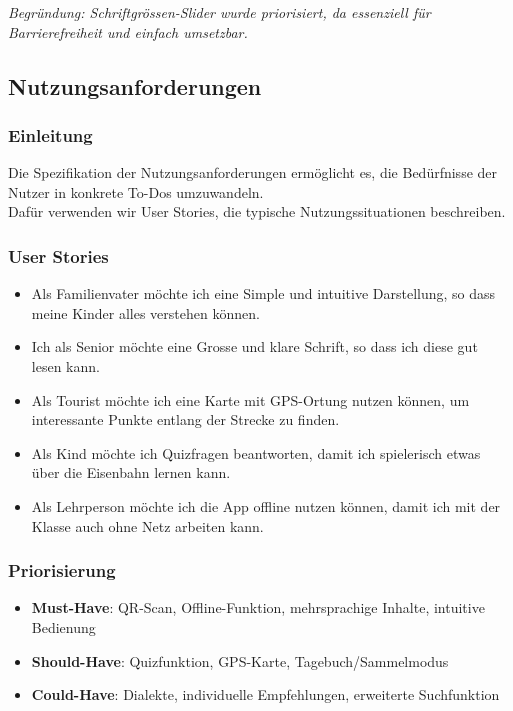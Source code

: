 \documentclass[10pt]{article}
\begin{document}
\textit{Begründung: Schriftgrössen-Slider wurde priorisiert, da essenziell für Barrierefreiheit und einfach umsetzbar.}
\pagebreak
\subsection{Nutzungsanforderungen}
\subsubsection{Einleitung}
Die Spezifikation der Nutzungsanforderungen ermöglicht es, die Bedürfnisse der Nutzer in konkrete To-Dos umzuwandeln.\\
Dafür verwenden wir User Stories, die typische Nutzungssituationen beschreiben.
\subsubsection{User Stories}
\begin{itemize}
	\item Als Familienvater möchte ich eine Simple und intuitive Darstellung, so dass meine Kinder alles verstehen können.
	\item Ich als Senior möchte eine Grosse und klare Schrift, so dass ich diese gut lesen kann.
	\item Als Tourist möchte ich eine Karte mit GPS-Ortung nutzen können, um interessante Punkte entlang der Strecke zu finden.
	\item Als Kind möchte ich Quizfragen beantworten, damit ich spielerisch etwas über die Eisenbahn lernen kann.
	\item Als Lehrperson möchte ich die App offline nutzen können, damit ich mit der Klasse auch ohne Netz arbeiten kann.
\end{itemize}

\subsubsection{Priorisierung}
\begin{itemize}
	\item \textbf{Must-Have}: QR-Scan, Offline-Funktion, mehrsprachige Inhalte, intuitive Bedienung
	\item \textbf{Should-Have}: Quizfunktion, GPS-Karte, Tagebuch/Sammelmodus
	\item \textbf{Could-Have}: Dialekte, individuelle Empfehlungen, erweiterte Suchfunktion
\end{itemize}
\end{document}

